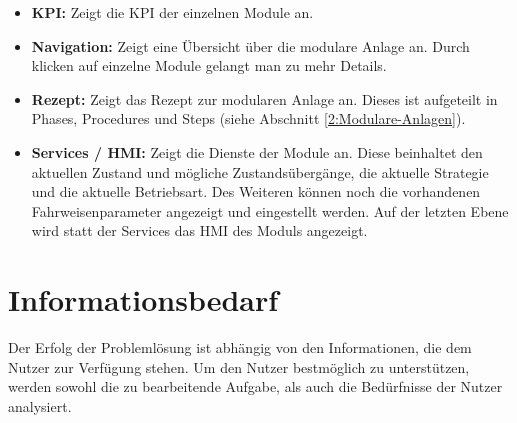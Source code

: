 \begin{itemize}
\item \textbf{KPI:} Zeigt die KPI der einzelnen Module an.
\item \textbf{Navigation:} Zeigt eine Übersicht über die modulare Anlage an. Durch klicken auf einzelne Module gelangt man zu mehr Details.
\item \textbf{Rezept:} Zeigt das Rezept zur modularen Anlage an. Dieses ist aufgeteilt in Phases, Procedures und Steps (siehe Abschnitt \ref{2:Modulare-Anlagen}).
\item \textbf{Services / HMI:} Zeigt die Dienste der Module an. Diese beinhaltet den aktuellen Zustand und mögliche Zustandsübergänge, die aktuelle Strategie  und die aktuelle Betriebsart. Des Weiteren können noch die vorhandenen Fahrweisenparameter angezeigt und eingestellt werden. Auf der letzten Ebene wird statt der Services das HMI des Moduls angezeigt.
\end{itemize}



\section{Informationsbedarf}
Der Erfolg der Problemlösung ist abhängig von den Informationen, die dem Nutzer zur Verfügung stehen.  Um den Nutzer bestmöglich zu unterstützen, werden sowohl die zu bearbeitende Aufgabe, als auch die Bedürfnisse der Nutzer analysiert.

